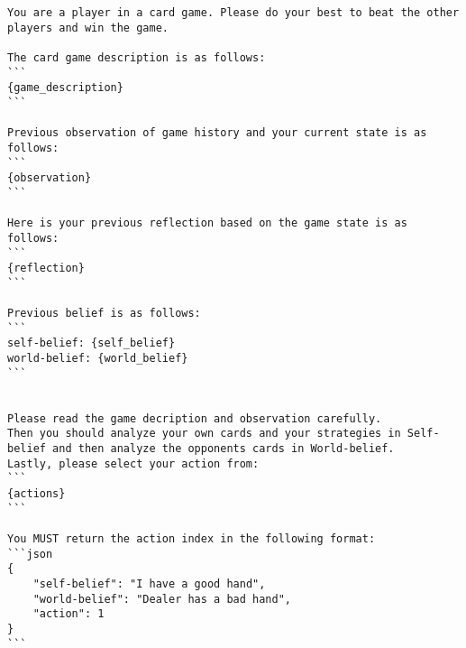 \begin{tcolorbox}[
breakable,
title=Game-play Prompt for Belief Agent,  
colframe=promptcolor, 
colback=white,
]
\begin{lstlisting}[]
You are a player in a card game. Please do your best to beat the other players and win the game.

The card game description is as follows:
```
{game_description}
```

Previous observation of game history and your current state is as follows:
```
{observation}
```

Here is your previous reflection based on the game state is as follows:
```
{reflection}
```

Previous belief is as follows:
```
self-belief: {self_belief}
world-belief: {world_belief}
```


Please read the game decription and observation carefully.
Then you should analyze your own cards and your strategies in Self-belief and then analyze the opponents cards in World-belief.
Lastly, please select your action from:
```
{actions}
```

You MUST return the action index in the following format:
```json
{
    "self-belief": "I have a good hand", 
    "world-belief": "Dealer has a bad hand", 
    "action": 1
}
```
\end{lstlisting}
\end{tcolorbox}
